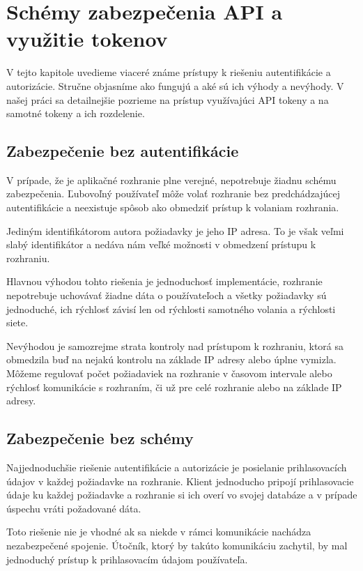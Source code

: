 \chapter{Schémy zabezpečenia API a využitie tokenov}

\label{kap:vyuzitie} %

V tejto kapitole uvedieme viaceré známe prístupy k riešeniu autentifikácie a autorizácie. Stručne objasníme ako fungujú a aké sú ich výhody a nevýhody. V našej práci sa detailnejšie pozrieme na prístup využívajúci API tokeny a na samotné tokeny a ich rozdelenie.

\section{Zabezpečenie bez autentifikácie}

V prípade, že je aplikačné rozhranie plne verejné, nepotrebuje žiadnu schému zabezpečenia. Ľubovoľný používateľ môže volať rozhranie bez predchádzajúcej autentifikácie a neexistuje spôsob ako obmedziť prístup k volaniam rozhrania.

Jediným identifikátorom autora požiadavky je jeho IP adresa. To je však veľmi slabý identifikátor a nedáva nám veľké možnosti v obmedzení prístupu k rozhraniu.

Hlavnou výhodou tohto riešenia je jednoduchosť implementácie, rozhranie nepotrebuje uchovávať žiadne dáta o používateľoch a všetky požiadavky sú jednoduché, ich rýchlosť závisí len od rýchlosti samotného volania a rýchlosti siete.

Nevýhodou je samozrejme strata kontroly nad prístupom k rozhraniu, ktorá sa obmedzila buď na nejakú kontrolu na základe IP adresy alebo úplne vymizla. Môžeme regulovať počet požiadaviek na rozhranie v časovom intervale alebo rýchlosť komunikácie s rozhraním, či už pre celé rozhranie alebo na základe IP adresy.


\section{Zabezpečenie bez schémy}

Najjednoduchšie riešenie autentifikácie a autorizácie je posielanie prihlasovacích údajov v každej požiadavke na rozhranie. Klient jednoducho pripojí prihlasovacie údaje ku každej požiadavke a rozhranie si ich overí vo svojej databáze a v prípade úspechu vráti požadované dáta.

Toto riešenie nie je vhodné ak sa niekde v rámci komunikácie nachádza nezabezpečené spojenie. Útočník, ktorý by  takúto komunikáciu zachytil, by mal jednoduchý prístup k prihlasovacím údajom používateľa.

